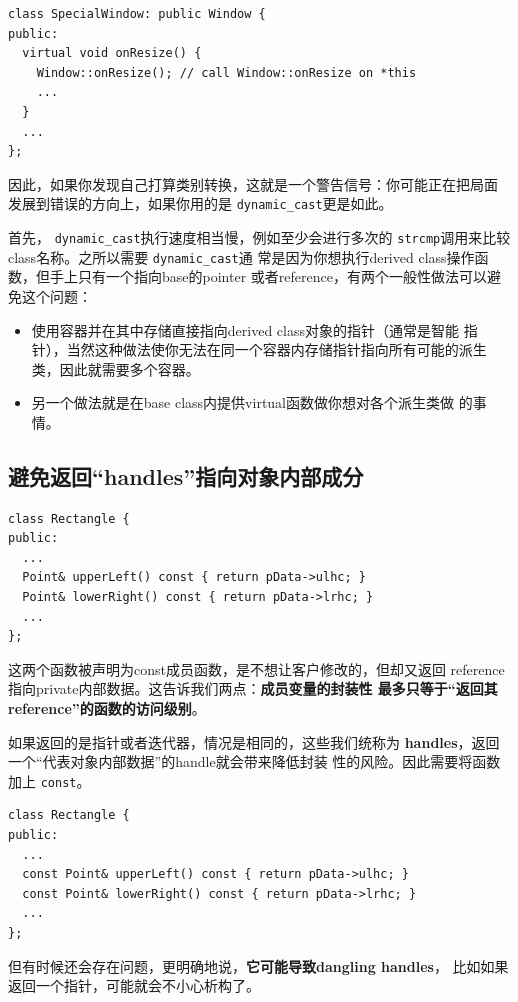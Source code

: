\documentclass[a4paper,twoside]{article}
\theoremstyle{definition}
\theoremstyle{remark}
\numberwithin{equation}{section}
\let\OldTexttt\texttt
\renewcommand{\texttt}[1]{{\color{blue} \OldTexttt{#1}}}
\begin{document}
\begin{verbatim}
class SpecialWindow: public Window {
public:
  virtual void onResize() {
    Window::onResize(); // call Window::onResize on *this
    ...
  }
  ...
};
\end{verbatim}

因此，如果你发现自己打算类别转换，这就是一个警告信号：你可能正在把局面
发展到错误的方向上，如果你用的是\texttt{dynamic\_cast}更是如此。

首先，\texttt{dynamic\_cast}执行速度相当慢，例如至少会进行多次的
\texttt{strcmp}调用来比较class名称。之所以需要\texttt{dynamic\_cast}通
常是因为你想执行derived class操作函数，但手上只有一个指向base的pointer
或者reference，有两个一般性做法可以避免这个问题：

\begin{itemize}
\item 使用容器并在其中存储直接指向derived class对象的指针（通常是智能
  指针），当然这种做法使你无法在同一个容器内存储指针指向所有可能的派生
  类，因此就需要多个容器。
\item 另一个做法就是在base class内提供virtual函数做你想对各个派生类做
  的事情。
\end{itemize}

\subsection{避免返回“handles”指向对象内部成分}
\label{sec:Item-28}

\begin{verbatim}
class Rectangle {
public:
  ...
  Point& upperLeft() const { return pData->ulhc; }
  Point& lowerRight() const { return pData->lrhc; }
  ...
};
\end{verbatim}

这两个函数被声明为const成员函数，是不想让客户修改的，但却又返回
reference指向private内部数据。这告诉我们两点：\textbf{成员变量的封装性
  最多只等于“返回其reference”的函数的访问级别}。

如果返回的是指针或者迭代器，情况是相同的，这些我们统称为
\textbf{handles}，返回一个“代表对象内部数据”的handle就会带来降低封装
性的风险。因此需要将函数加上\texttt{const}。
\begin{verbatim}
class Rectangle {
public:
  ...
  const Point& upperLeft() const { return pData->ulhc; }
  const Point& lowerRight() const { return pData->lrhc; }
  ...
};
\end{verbatim}

但有时候还会存在问题，更明确地说，\textbf{它可能导致dangling handles}，
比如如果返回一个指针，可能就会不小心析构了。
\end{document}
